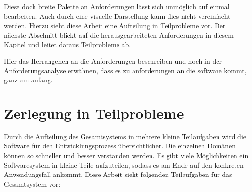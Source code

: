 Diese doch breite Palette an Anforderungen lässt sich unmöglich auf einmal bearbeiten.
Auch durch eine visuelle Darstellung kann dies nicht vereinfacht werden. Hierzu sieht
diese Arbeit eine Aufteilung in Teilprobleme vor. Der nächste Abschnitt blickt
auf die herausgearbeiteten Anforderungen in diesem Kapitel und leitet daraus
Teilprobleme ab.

Hier das Herrangehen an die Anforderungen beschreiben und noch in der
Anforderungsanalyse erwähnen, dass es zu anforderungen an die software kommt,
ganz am anfang.

\section{Zerlegung in Teilprobleme}
\label{sec_zerlegung_in_teilprobleme} Durch die Aufteilung des Gesamtsystems in
mehrere kleine Teilaufgaben wird die Software für den Entwicklungsprozess
übersichtlicher. Die einzelnen Domänen können so schneller und besser verstanden
werden. Es gibt viele Möglichkeiten ein Softwaresystem in kleine Teile
aufzuteilen, sodass es am Ende auf den konkreten Anwendungsfall ankommt. Diese
Arbeit sieht folgenden Teilaufgaben für das Gesamtsystem vor:

